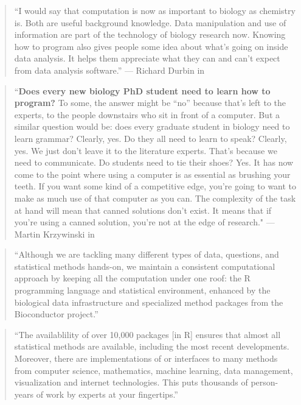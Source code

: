 \documentclass[]{tufte-book}
\begin{document}
\begin{quote}
``I would say that computation is now as important to biology as chemistry is.
Both are useful background knowledge. Data manipulation and use of information
are part of the technology of biology research now. Knowing how to program also
gives people some idea about what's going on inside data analysis. It helps them
appreciate what they can and can't expect from data analysis software.'' ---
Richard Durbin in \citep{altschul2013anatomy}
\end{quote}

\begin{quote}
``\textbf{Does every new biology PhD student need to learn how to program?} To some,
the answer might be ``no'' because that's left to the experts, to the people
downstairs who sit in front of a computer. But a similar question would be: does
every graduate student in biology need to learn grammar? Clearly, yes. Do they
all need to learn to speak? Clearly, yes. We just don't leave it to the
literature experts. That's because we need to communicate. Do students need to
tie their shoes? Yes. It has now come to the point where using a computer is as
essential as brushing your teeth. If you want some kind of a competitive edge,
you're going to want to make as much use of that computer as you can. The
complexity of the task at hand will mean that canned solutions don't exist. It
means that if you're using a canned solution, you're not at the edge of
research." --- Martin Krzywinski in \citep{altschul2013anatomy}
\end{quote}

\begin{quote}
``Although we are tackling many different types of data, questions, and
statistical methods hands-on, we maintain a consistent computational approach
by keeping all the computation under one roof: the R programming language and
statistical environment, enhanced by the biological data infrastructure and
specialized method packages from the Bioconductor project.'' \citep{holmes2018modern}
\end{quote}

\begin{quote}
``The availablility of over 10,000 packages {[}in R{]} ensures that almost all
statistical methods are available, including the most recent developments.
Moreover, there are implementations of or interfaces to many methods from
computer science, mathematics, machine learning, data management, visualization
and internet technologies. This puts thousands of person-years of work by
experts at your fingertips.'' \citep{holmes2018modern}
\end{quote}
\end{document}

